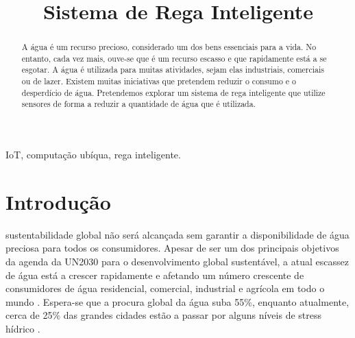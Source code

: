 \documentclass[conference]{IEEEtran}
\begin{document}
\title{Sistema de Rega Inteligente}

\author{
\and
{}
}

\maketitle

\begin{abstract}
A água é um recurso precioso, considerado um dos bens essenciais para a vida.
No entanto, cada vez mais, ouve-se que é um recurso escasso e que rapidamente
está a se esgotar. A água é utilizada para muitas atividades, sejam elas industriais,
comerciais ou de lazer. Existem muitas iniciativas que pretendem reduzir o
consumo e o desperdício de água. Pretendemos explorar um sistema de rega
inteligente que utilize sensores de forma a reduzir a quantidade de água que
é utilizada. \\
\end{abstract}

\begin{IEEEkeywords}
IoT, computação ubíqua, rega inteligente.
\end{IEEEkeywords}

\section{Introdução}

 sustentabilidade global não será alcançada sem garantir a
disponibilidade de água preciosa para todos os consumidores. Apesar de ser um
dos principais objetivos da agenda da UN2030 \cite{un2015agenda} para o desenvolvimento
global sustentável, a atual escassez de água está a crescer rapidamente e
afetando um número crescente de consumidores de água residencial, comercial,
industrial e agrícola em todo o mundo \cite{mishra2021water}. Espera-se que a
procura global da água suba 55\%, enquanto atualmente, cerca de 25\% das grandes
cidades estão a passar por alguns níveis de stress hídrico \cite{josefine2021differentiated}.
\end{document}
